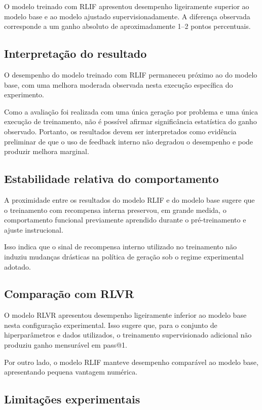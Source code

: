\documentclass[11pt,a4paper]{article}
\begin{document}
O modelo treinado com RLIF apresentou desempenho ligeiramente superior ao modelo base e ao modelo ajustado supervisionadamente. A diferença observada corresponde a um ganho absoluto de aproximadamente 1--2 pontos percentuais.

\subsection{Interpretação do resultado}

O desempenho do modelo treinado com RLIF permaneceu próximo ao do modelo base, com uma melhora moderada observada nesta execução específica do experimento.

Como a avaliação foi realizada com uma única geração por problema e uma única execução de treinamento, não é possível afirmar significância estatística do ganho observado. Portanto, os resultados devem ser interpretados como evidência preliminar de que o uso de feedback interno não degradou o desempenho e pode produzir melhora marginal.

\subsection{Estabilidade relativa do comportamento}

A proximidade entre os resultados do modelo RLIF e do modelo base sugere que o treinamento com recompensa interna preservou, em grande medida, o comportamento funcional previamente aprendido durante o pré-treinamento e ajuste instrucional.

Isso indica que o sinal de recompensa interno utilizado no treinamento não induziu mudanças drásticas na política de geração sob o regime experimental adotado.

\subsection{Comparação com RLVR}

O modelo RLVR apresentou desempenho ligeiramente inferior ao modelo base nesta configuração experimental. Isso sugere que, para o conjunto de hiperparâmetros e dados utilizados, o treinamento supervisionado adicional não produziu ganho mensurável em pass@1.

Por outro lado, o modelo RLIF manteve desempenho comparável ao modelo base, apresentando pequena vantagem numérica.

\subsection{Limitações experimentais}
\end{document}
